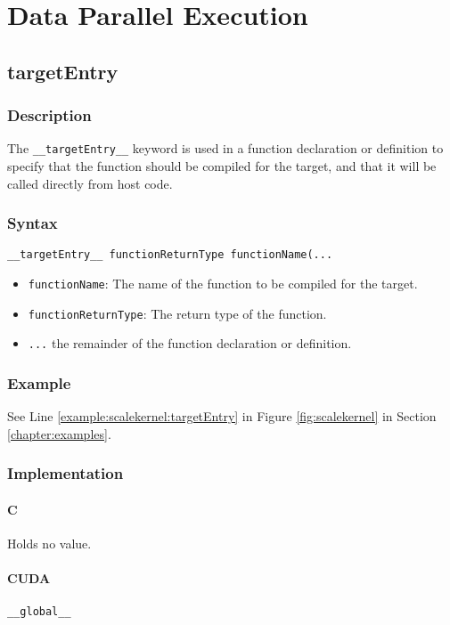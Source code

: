 \chapter{Data Parallel Execution}

\newpage
\section{targetEntry}
\subsection{Description}

The \verb+__targetEntry__+ keyword is used in a function declaration
or definition to specify that the function should be compiled for the
target, and that it will be called directly from host code.

\subsection{Syntax}
\begin{verbatim}
__targetEntry__ functionReturnType functionName(...
\end{verbatim}

\begin{itemize}
\item \verb+functionName+: The name of the function to be compiled for the target.
\item \verb+functionReturnType+: The return type of the function.
\item \verb+...+ the remainder of the function declaration or definition.
\end{itemize}


\subsection{Example}
See Line \ref{example:scalekernel:targetEntry} in Figure \ref{fig:scalekernel} in Section \ref{chapter:examples}.

\subsection{Implementation}
\subsubsection{C}
Holds no value.
\subsubsection{CUDA}
\verb+__global__+

